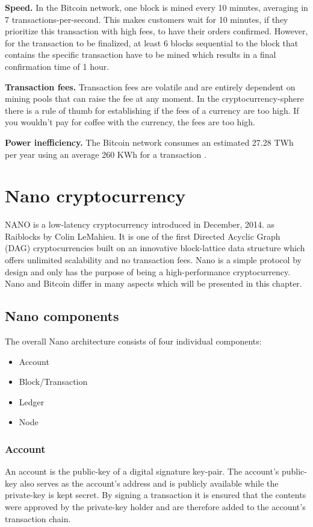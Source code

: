 \documentclass{ferseminar}
\begin{document}
\textbf{Speed.} In the Bitcoin network, one block is mined every 10 minutes, averaging in 7 transactions-per-second. This makes customers wait for 10 minutes, if they prioritize this transaction with high fees, to have their orders confirmed. However, for the transaction to be finalized, at least 6 blocks sequential to the block that contains the specific transaction have to be mined which results in a final confirmation time of 1 hour.

\textbf{Transaction fees.} Transaction fees are volatile and are entirely dependent on mining pools that can raise the fee at any moment. In the cryptocurrency-sphere there is a rule of thumb for establishing if the fees of a currency are too high. If you wouldn't pay for coffee with the currency, the fees are too high.

\textbf{Power inefficiency.} The Bitcoin network consumes an estimated 27.28 TWh per year using an average 260 KWh for a transaction \cite{Nano}.

\section{Nano cryptocurrency}

NANO is a low-latency cryptocurrency introduced in December, 2014. as Raiblocks by Colin LeMahieu. It is one of the first Directed Acyclic Graph (DAG) cryptocurrencies built on an innovative block-lattice data structure which offers unlimited scalability and no transaction fees. Nano is a simple protocol by design and only has the purpose of being a high-performance cryptocurrency. Nano and Bitcoin differ in many aspects which will be presented in this chapter.

\subsection{Nano components}
The overall Nano architecture consists of four individual components:
\begin{itemize}
	\item Account
	\item Block/Transaction
	\item Ledger
	\item Node
\end{itemize}

\subsubsection{Account}
An account is the public-key of a digital signature key-pair. The account's public-key also serves as the account's address and is publicly available while the private-key is kept secret. By signing a transaction it is ensured that the contents were approved by the private-key holder and are therefore added to the account's transaction chain. 
\end{document}
